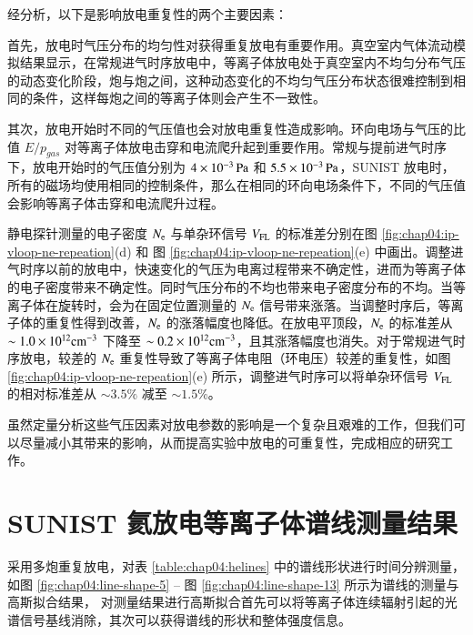经分析，以下是影响放电重复性的两个主要因素：

首先，放电时气压分布的均匀性对获得重复放电有重要作用。真空室内气体流动模拟结果显示，在常规进气时序放电中，等离子体放电处于真空室内不均匀分布气压的动态变化阶段，炮与炮之间，这种动态变化的不均匀气压分布状态很难控制到相同的条件，这样每炮之间的等离子体则会产生不一致性。

其次，放电开始时不同的气压值也会对放电重复性造成影响。环向电场与气压的比值 $E/p_{gas}$ 对等离子体放电击穿和电流爬升起到重要作用\cite{Antonio2001:TCABR:breakdown,Chattopa1996:SINP:breakdown}。常规与提前进气时序下，放电开始时的气压值分别为 $4\times10^{-3}\,{\rm Pa}$ 和 $5.5\times10^{-3}\,{\rm Pa}$，SUNIST 放电时，所有的磁场均使用相同的控制条件，那么在相同的环向电场条件下，不同的气压值会影响等离子体击穿和电流爬升过程。

静电探针测量的电子密度 $N_{\rm e}$ 与单杂环信号 $V_{\rm FL}$ 的标准差分别在图 \ref{fig:chap04:ip-vloop-ne-repeation}(d) 和 图 \ref{fig:chap04:ip-vloop-ne-repeation}(e) 中画出。调整进气时序以前的放电中，快速变化的气压为电离过程带来不确定性，进而为等离子体的电子密度带来不确定性。同时气压分布的不均也带来电子密度分布的不均。当等离子体在旋转时，会为在固定位置测量的 $N_{\rm e}$ 信号带来涨落。当调整时序后，等离子体的重复性得到改善，$N_{\rm e}$ 的涨落幅度也降低。在放电平顶段，$N_{\rm e}$ 的标准差从 $\sim1.0\times10^{12}{\rm cm}^{-3}$ 下降至 $\sim0.2\times10^{12}{\rm cm}^{-3}$，且其涨落幅度也消失。对于常规进气时序放电，较差的 $N_{\rm e}$ 重复性导致了等离子体电阻（环电压）较差的重复性，如图 \ref{fig:chap04:ip-vloop-ne-repeation}(e) 所示，调整进气时序可以将单杂环信号 $V_{\rm FL}$ 的相对标准差从 $\sim3.5\%$ 减至 $\sim1.5\%$。

虽然定量分析这些气压因素对放电参数的影响是一个复杂且艰难的工作，但我们可以尽量减小其带来的影响，从而提高实验中放电的可重复性，完成相应的研究工作。

\graphicspath{{figures/chap04/}}
\section{SUNIST 氦放电等离子体谱线测量结果}
\label{sec:chap04:line-measure-result}

采用多炮重复放电，对表 \ref{table:chap04:helines} 中的谱线形状进行时间分辨测量，如图 \ref{fig:chap04:line-shape-5} -- 图 \ref{fig:chap04:line-shape-13} 所示为谱线的测量与高斯拟合结果，
对测量结果进行高斯拟合首先可以将等离子体连续辐射引起的光谱信号基线消除，其次可以获得谱线的形状和整体强度信息。

